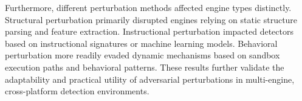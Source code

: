 Furthermore, different perturbation methods affected engine types distinctly. Structural perturbation primarily disrupted engines relying on static structure parsing and feature extraction. Instructional perturbation impacted detectors based on instructional signatures or machine learning models. Behavioral perturbation more readily evaded dynamic mechanisms based on sandbox execution paths and behavioral patterns. These results further validate the adaptability and practical utility of adversarial perturbations in multi-engine, cross-platform detection environments.


